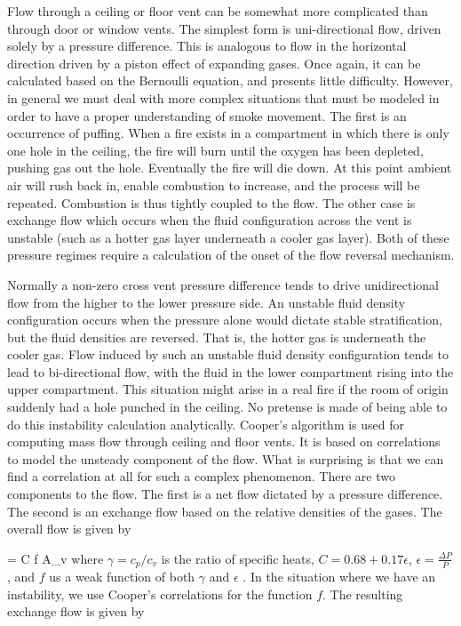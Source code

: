 Flow through a ceiling or floor vent can be somewhat more complicated than through door or window vents.  The simplest form is uni-directional flow, driven solely by a pressure difference.  This is analogous to flow in the horizontal direction driven by a piston effect of expanding gases.  Once again, it can be calculated based on the Bernoulli equation, and presents little difficulty.  However, in general we must deal with more complex situations that must be modeled in order to have a proper understanding of smoke movement.  The first is an occurrence of puffing.  When a fire exists in a compartment in which there is only one hole in the ceiling, the fire will burn until the oxygen has been depleted, pushing gas out the hole.  Eventually the fire will die down.  At this point ambient air will rush back in, enable combustion to increase, and the process will be repeated.  Combustion is thus tightly coupled to the flow.  The other case is exchange flow which occurs when the fluid configuration across the vent is unstable (such as a hotter gas layer underneath a cooler gas layer).  Both of these pressure regimes require a calculation of the onset of the flow reversal mechanism.

Normally a non-zero cross vent pressure difference tends to drive unidirectional flow from the higher to the lower pressure side.  An unstable fluid density configuration occurs when the pressure alone would dictate stable stratification, but the fluid densities are reversed.  That is, the hotter gas is underneath the cooler gas.  Flow induced by such an unstable fluid density configuration tends to lead to bi-directional flow, with the fluid in the lower compartment rising into the upper compartment.  This situation might arise in a real fire if the room of origin suddenly had a hole punched in the ceiling. No pretense is made of being able to do this instability calculation analytically. Cooper's algorithm \cite{Cooper:1989} is used for computing mass flow through ceiling and floor vents. It is based on correlations to model the unsteady component of the flow.  What is surprising is that we can find a correlation at all for such a complex phenomenon. There are two components to the flow.  The first is a net flow dictated by a pressure difference. The second is an exchange flow based on the relative densities of the gases.  The overall flow is given by \cite{Cooper:1989, Cooper:1990, Cooper:1995}

\be \dm = C f\brackets{\gamma, \epsilon}  A_v \ee
where $\gamma = c_p/c_v$ is the ratio of specific heats, $C = 0.68 + 0.17 \epsilon$, $\epsilon = \frac{\Delta P}{P}$, and $f$ us a weak function of both $\gamma$ and $\epsilon$ \cite{Cooper:1989}. In the situation where we have an instability, we use Cooper's correlations for the function $f$.  The resulting exchange flow is given by

